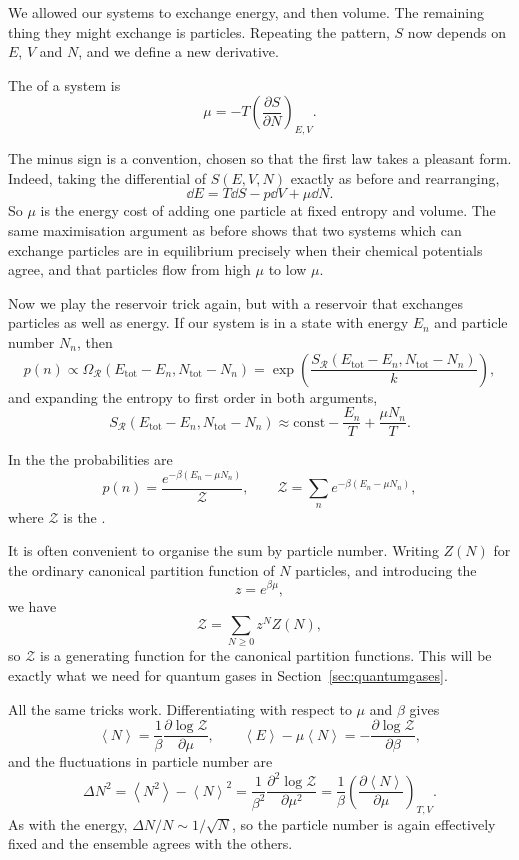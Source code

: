 \documentclass[a4paper]{scrartcl}
\newcommand{\avg}[1]{\left\langle #1 \right\rangle}
\begin{document}
We allowed our systems to exchange energy, and then volume. The remaining thing they might exchange is particles. Repeating the pattern, $S$ now depends on $E$, $V$ and $N$, and we define a new derivative.

\begin{definition}
	The  of a system is
	$$
	\mu = -T\left(\frac{\partial S}{\partial N}\right)_{E,V}.
	$$
\end{definition}

The minus sign is a convention, chosen so that the first law takes a pleasant form. Indeed, taking the differential of $S(E,V,N)$ exactly as before and rearranging,
$$
\dd E = T\dd S - p\dd V + \mu\dd N.
$$
So $\mu$ is the energy cost of adding one particle at fixed entropy and volume. The same maximisation argument as before shows that two systems which can exchange particles are in equilibrium precisely when their chemical potentials agree, and that particles flow from high $\mu$ to low $\mu$.

Now we play the reservoir trick again, but with a reservoir that exchanges particles as well as energy. If our system is in a state with energy $E_n$ and particle number $N_n$, then
$$
p(n) \propto \Omega_{\mathcal R}(E_{\mathrm{tot}} - E_n, N_{\mathrm{tot}} - N_n) = \exp\left(\frac{S_{\mathcal R}(E_{\mathrm{tot}} - E_n, N_{\mathrm{tot}} - N_n)}{k}\right),
$$
and expanding the entropy to first order in both arguments,
$$
S_{\mathcal R}(E_{\mathrm{tot}} - E_n, N_{\mathrm{tot}} - N_n) \approx \text{const} - \frac{E_n}{T} + \frac{\mu N_n}{T}.
$$

\begin{definition}
	In the  the probabilities are
	$$
	p(n) = \frac{e^{-\beta(E_n - \mu N_n)}}{\mathcal Z}, \qquad \mathcal Z = \sum_n e^{-\beta(E_n - \mu N_n)},
	$$
	where $\mathcal Z$ is the .
\end{definition}

It is often convenient to organise the sum by particle number. Writing $Z(N)$ for the ordinary canonical partition function of $N$ particles, and introducing the 
$$
z = e^{\beta\mu},
$$
we have
$$
\mathcal Z = \sum_{N \geq 0} z^N Z(N),
$$
so $\mathcal Z$ is a generating function for the canonical partition functions. This will be exactly what we need for quantum gases in Section~\ref{sec:quantumgases}.

All the same tricks work. Differentiating with respect to $\mu$ and $\beta$ gives
$$
\avg N = \frac{1}{\beta}\frac{\partial \log \mathcal Z}{\partial \mu}, \qquad \avg{E} - \mu \avg N = -\frac{\partial \log \mathcal Z}{\partial \beta},
$$
and the fluctuations in particle number are
$$
\Delta N^2 = \avg{N^2} - \avg N^2 = \frac{1}{\beta^2}\frac{\partial^2 \log \mathcal Z}{\partial \mu^2} = \frac{1}{\beta}\left(\frac{\partial \avg N}{\partial\mu}\right)_{T,V}.
$$
As with the energy, $\Delta N/N \sim 1/\sqrt N$, so the particle number is again effectively fixed and the ensemble agrees with the others.
\end{document}
